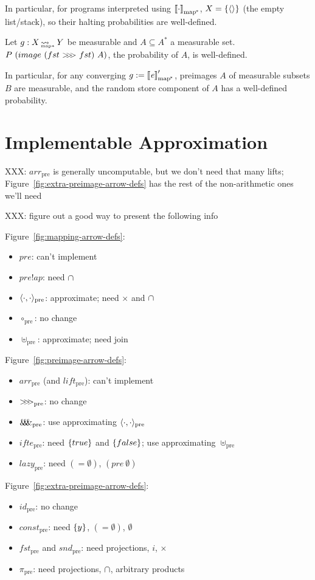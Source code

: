 \documentclass[preprint]{sigplanconf}
\newcommand{\arrow}{\rightsquigarrow}
\newcommand{\arrowlift}{\ensuremath{lift}}
\newcommand{\arrowarr}{\ensuremath{arr}}
\newcommand{\arrowcomp}{\ensuremath{{>}\mspace{-6mu}{>}\mspace{-6mu}{>}}}
\newcommand{\arrowpair}{\ensuremath{\mathit{\&\mspace{-7.5mu}\&\mspace{-7.5mu}\&}}}
\newcommand{\arrowif}{\ensuremath{ifte}}
\newcommand{\arrowlazy}{\ensuremath{lazy}}
\newcommand{\pre}{_\mathrm{pre}}
\newcommand{\liftpre}{\arrowlift\pre}
\newcommand{\arrpre}{\arrowarr\pre}
\newcommand{\comppre}{\arrowcomp\pre}
\newcommand{\pairpre}{\arrowpair\pre}
\newcommand{\ifpre}{\arrowif\pre}
\newcommand{\lazypre}{\arrowlazy\pre}
\newcommand{\pmap}{_\mathrm{map^{\mspace{-2mu}*}}}
\DeclareMathOperator{\pmapto}{\arrow_{\mspace{-22mu}_{\mathrm{map*}}}}
\begin{document}
In particular, for programs interpreted using $\meaningof{\cdot}\pmap$, $X = \{{\langle{}\rangle}\}$ (the empty list/stack), so their halting probabilities are well-defined.

\begin{corollary}
Let $g : X \pmapto Y$ be measurable and $A \subseteq A^*$ a measurable set.
$P~(image~(fst~\arrowcomp~fst)~A)$, the probability of $A$, is well-defined.
\end{corollary}

In particular, for any converging $g := \meaningof{\mathit{e}}\pmap'$, preimages $A$ of measurable subsets $B$ are measurable, and the random store component of $A$ has a well-defined probability.


\section{Implementable Approximation}

XXX: $\arrpre$ is generally uncomputable, but we don't need that many lifts; Figure~\ref{fig:extra-preimage-arrow-defs} has the rest of the non-arithmetic ones we'll need

XXX: figure out a good way to present the following info

Figure~\ref{fig:mapping-arrow-defs}:
\begin{itemize}
	\item $pre$: can't implement
	\item $pre!ap$: need $\cap$
	\item $\pair{\cdot,\cdot}\pre$: approximate; need $\times$ and $\cap$
	\item $\circ\pre$: no change
	\item $\uplus\pre$: approximate; need join
\end{itemize}

Figure~\ref{fig:preimage-arrow-defs}:
\begin{itemize}
	\item $\arrpre$ (and $\liftpre$): can't implement
	\item $\comppre$: no change
	\item $\pairpre$: use approximating $\pair{\cdot,\cdot}\pre$
	\item $\ifpre$: need $\{{true}\}$ and $\{{false}\}$; use approximating $\uplus\pre$
	\item $\lazypre$: need $(= \emptyset)$, $(pre~\emptyset)$
\end{itemize}

Figure~\ref{fig:extra-preimage-arrow-defs}:
\begin{itemize}
	\item $id\pre$: no change
	\item $const\pre$: need $\{{y}\}$, $(= \emptyset)$, $\emptyset$
	\item $fst\pre$ and $snd\pre$: need projections, $i$, $\times$
	\item $\pi\pre$: need projections, $\cap$, arbitrary products
\end{itemize}
\end{document}
